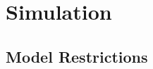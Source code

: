 \clearpage
\section{Simulation}
\label{sec:Simulation}

\subsection{Model Restrictions}
\label{subsec:Simulation/restrictions}
